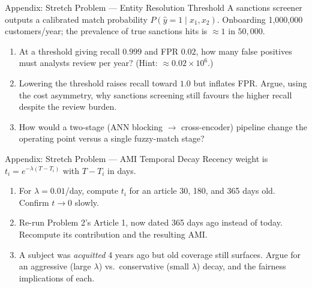 \documentclass[9pt,t]{beamer}
\begin{document}

\begin{frame}[noframenumbering]{Appendix: Stretch Problem --- Entity Resolution Threshold}
A sanctions screener outputs a calibrated match probability
$P(\hat y = 1 \mid x_1, x_2)$. Onboarding 1{,}000{,}000 customers/year; the
prevalence of true sanctions hits is $\approx 1$ in $50{,}000$.

\begin{enumerate}
  \item At a threshold giving recall $0.999$ and FPR $0.02$, how many false
        positives must analysts review per year? (Hint: $\approx
        0.02 \times 10^6$.)
  \item Lowering the threshold raises recall toward $1.0$ but inflates FPR. Argue,
        using the cost asymmetry, why sanctions screening still favours the higher
        recall despite the review burden.
  \item How would a two-stage (ANN blocking $\to$ cross-encoder) pipeline change
        the operating point versus a single fuzzy-match stage?
\end{enumerate}
\end{frame}

\begin{frame}[noframenumbering]{Appendix: Stretch Problem --- AMI Temporal Decay}
Recency weight is $t_i = e^{-\lambda (T - T_i)}$ with $T - T_i$ in days.

\begin{enumerate}
  \item For $\lambda = 0.01$/day, compute $t_i$ for an article 30, 180, and 365
        days old. Confirm $t \to 0$ slowly.
  \item Re-run Problem 2's Article 1, now dated 365 days ago instead of today.
        Recompute its contribution and the resulting AMI.
  \item A subject was \emph{acquitted} 4 years ago but old coverage still surfaces.
        Argue for an aggressive (large $\lambda$) vs.\ conservative (small
        $\lambda$) decay, and the fairness implications of each.
\end{enumerate}
\end{frame}
\end{document}
